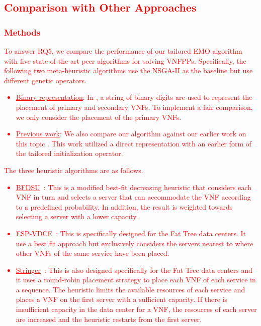 \textcolor{red}{
\subsection{Comparison with Other Approaches}}
\label{sec:state_of_the_art}

\textcolor{red}{
\subsubsection{Methods}
To answer RQ5, we compare the performance of our tailored EMO algorithm with five state-of-the-art peer algorithms for solving VNFPPs. Specifically, the following two meta-heuristic algorithms use the NSGA-II as the baseline but use different genetic operators.
\begin{itemize}
    \item\underline{Binary representation}: In \cite{ChantreF20}, a string of binary digits are used to represent the placement of primary and secondary VNFs. To implement a fair comparison, we only consider the placement of the primary VNFs.
    \item\underline{Previous work}: We also compare our algorithm against our earlier work on this topic \cite{BillingsleyLMMG19}. This work utilized a direct representation with an earlier form of the tailored initialization operator.
\end{itemize}
The three heuristic algorithms are as follows.
\begin{itemize}
    \item\underline{BFDSU}~\cite{ZhangXLLGW17}: This is a modified best-fit decreasing heuristic that considers each VNF in turn and selects a server that can accommodate the VNF according to a predefined probability. In addition, the result is weighted towards selecting a server with a lower capacity.
    \item\underline{ESP-VDCE}~\cite{KaurGK020}: This is specifically designed for the Fat Tree data centers. It use a best fit approach but exclusively considers the servers nearest to where other VNFs of the same service have been placed.
    \item\underline{Stringer}~\cite{ChuaWZSH16}: This is also designed specifically for the Fat Tree data centers and it uses a round-robin placement strategy to place each VNF of each service in a sequence. The heuristic limits the available resources of each service and places a VNF on the first server with a sufficient capacity. If there is insufficient capacity in the data center for a VNF, the resources of each server are increased and the heuristic restarts from the first server.

\end{itemize}}
